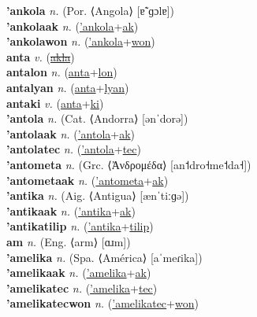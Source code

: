 \textbf{'ankola} \textit{n.} (Por. ⟨Angola⟩ [ɐ̃ˈɡɔlɐ])
 \label{'ankola} \\
\textbf{'ankolaak} \textit{n.} (\hyperref['ankola]{'ankola}+\hyperref[ak]{ak})
 \label{'ankolaak} \\
\textbf{'ankolawon} \textit{n.} (\hyperref['ankola]{'ankola}+\hyperref[won]{won})
 \label{'ankolawon} \\
\textbf{anta} \textit{v.} (\hyperref[akla]{\sout{akla}})
 \label{anta} \\
\textbf{antalon} \textit{n.} (\hyperref[anta]{anta}+\hyperref[lon]{lon})
 \label{antalon} \\
\textbf{antalyan} \textit{n.} (\hyperref[anta]{anta}+\hyperref[lyan]{lyan})
 \label{antalyan} \\
\textbf{antaki} \textit{v.} (\hyperref[anta]{anta}+\hyperref[ki]{ki})
 \label{antaki} \\
\textbf{'antola} \textit{n.} (Cat. ⟨Andorra⟩ [ənˈdorə])
 \label{'antola} \\
\textbf{'antolaak} \textit{n.} (\hyperref['antola]{'antola}+\hyperref[ak]{ak})
 \label{'antolaak} \\
\textbf{'antolatec} \textit{n.} (\hyperref['antola]{'antola}+\hyperref[tec]{tec})
 \label{'antolatec} \\
\textbf{'antometa} \textit{n.} (Grc. ⟨Ἀνδρομέδα⟩ [an˦dro˧me˦da˧])
 \label{'antometa} \\
\textbf{'antometaak} \textit{n.} (\hyperref['antometa]{'antometa}+\hyperref[ak]{ak})
 \label{'antometaak} \\
\textbf{'antika} \textit{n.} (Aig. ⟨Antigua⟩ [ænˈtiːɡə])
 \label{'antika} \\
\textbf{'antikaak} \textit{n.} (\hyperref['antika]{'antika}+\hyperref[ak]{ak})
 \label{'antikaak} \\
\textbf{'antikatilip} \textit{n.} (\hyperref['antika]{'antika}+\hyperref[tilip]{tilip})
 \label{'antikatilip} \\
\textbf{am} \textit{n.} (Eng. ⟨arm⟩ [ɑɹm])
 \label{am} \\
\textbf{'amelika} \textit{n.} (Spa. ⟨América⟩ [aˈmeɾika])
 \label{'amelika} \\
\textbf{'amelikaak} \textit{n.} (\hyperref['amelika]{'amelika}+\hyperref[ak]{ak})
 \label{'amelikaak} \\
\textbf{'amelikatec} \textit{n.} (\hyperref['amelika]{'amelika}+\hyperref[tec]{tec})
 \label{'amelikatec} \\
\textbf{'amelikatecwon} \textit{n.} (\hyperref['amelikatec]{'amelikatec}+\hyperref[won]{won})
